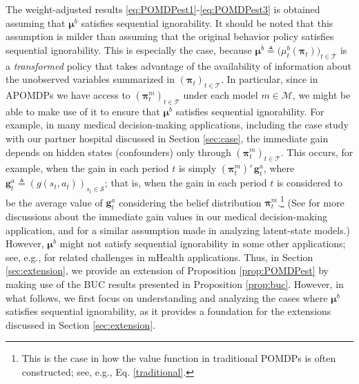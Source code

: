 \documentclass[opre,nonblindrev]{informs2}%
\newcommand{\teq}{\triangleq}
\newcommand{\1}{\hbox{\rm 1\kern-.35em 1}}
\newcommand{\MS}{\mathscr S}
\newcommand{\MT}{\mathscr T}
\newcommand{\MM}{\mathscr M}
\newcommand{\g}{\mathbf{g}}
\newcommand{\bpi}{\boldsymbol{\pi}}
\newcommand{\bmu}{\boldsymbol{\mu}}
\begin{document}
\begin{remark} \label{remark:BUC}
The weight-adjusted results \eqref{eq:POMDPest1}-\eqref{eq:POMDPest3} is obtained assuming that $\bmu^b$ satisfies sequential ignorability. It should be noted that this assumption is milder than assuming that the original behavior policy satisfies sequential ignorability. This is especially the case, because $\bmu^b\teq\big(\mu^b_t(\bpi_t)\big)_{t\in\MT}$ is a {\em transformed} policy that takes advantage of the availability of information about the unobserved variables summarized in $(\bpi_t)_{t\in\MT}$.  In particular, since in APOMDPs \citep{Saghafian2018} we have access to $(\bpi^m_t)_{t\in\MT}$ under each model $m\in\MM$, we might be able to make use of it to ensure that $\bmu^b$ satisfies sequential ignorability. For example, in many medical decision-making applications, including  the case study with our partner hospital discussed in Section \ref{sec:case}, the immediate gain  depends on hidden states (confounders) only through $(\bpi^m_t)_{t\in\MT}$. This occurs, for example, when the gain in each period $t$ is simply $(\bpi^m_t)'\,\g^a_t$, where $\g^a_t\teq (g(s_t, a_t))_{s_t\in\MS}$; that is, when the gain in each period $t$ is considered to be the average value of $\g^a_t$ considering the belief distribution $\bpi^m_t$.\footnote{This is the case in how the value function in traditional POMDPs is often constructed; see, e.g., Eq. \eqref{traditional}.} (See  \cite{Boloori2020} for more discussions about the immediate gain values in our medical decision-making application, and \cite{Xu2020} for a similar assumption made in analyzing latent-state models.) However, $\bmu^b$ might not satisfy sequential ignorability in some other applications; see, e.g., \cite{Saghafian2021} for related challenges in mHealth applications. Thus, in Section \ref{sec:extension}, we provide an extension of Proposition \ref{prop:POMDPest} by making use of  the BUC results presented in Proposition \ref{prop:buc}. However, in what follows, we first focus on understanding and analyzing the cases where $\bmu^b$ satisfies sequential ignorability, as it provides a foundation for  the extensions discussed in Section \ref{sec:extension}.

\end{remark}
\end{document}
